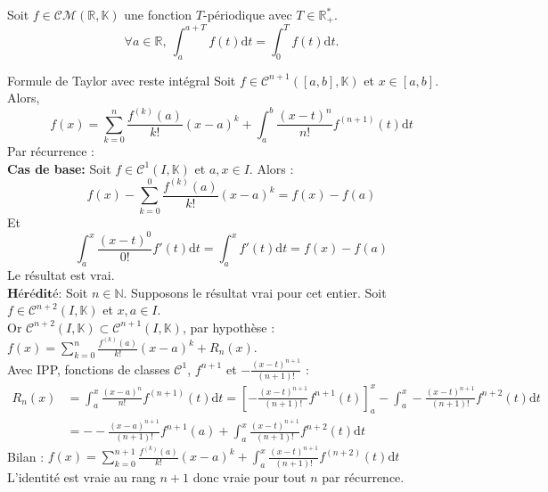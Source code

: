 \documentclass[11pt]{article}
\newcommand*{\K}{\mathbb{K}}
\newcommand*{\R}{\mathbb{R}}
\newcommand*{\N}{\mathbb{N}}
\newcommand*{\CM}{\mathcal{CM}}
\newcommand*{\m}{\mathcal}
\newcommand{\0}{\varnothing}
\newcommand{\dt}{\textrm{d}t}
\begin{document}
\begin{corr}{}{}
    Soit $f\in\CM(\R,\K)$ une fonction $T$-périodique avec $T\in\R^*_+$.
    \begin{equation*}
        \forall a\in\R, ~ \int_a^{a+T}f(t)\dt=\int_0^Tf(t)\dt.
    \end{equation*}
\end{corr}

\begin{thm}{Formule de Taylor avec reste intégral}{}
    Soit $f\in\m{C}^{n+1}([a,b],\K)$ et $x\in[a,b]$. Alors,
    \begin{equation*}
        f(x)=\sum_{k=0}^n\frac{f^{(k)}(a)}{k!}(x-a)^k+\int_a^b\frac{(x-t)^n}{n!}f^{(n+1)}(t)\dt
    \end{equation*}
    \tcblower
    Par récurrence :\\
    \textbf{Cas de base:} Soit $f\in\m{C}^1(I,\K)$ et $a,x\in I$. Alors :
    \begin{equation*}
        f(x)-\sum_{k=0}^0\frac{f^{(k)}(a)}{k!}(x-a)^k=f(x)-f(a)
    \end{equation*}
    Et
    \begin{equation*}
        \int_a^x\frac{(x-t)^0}{0!}f'(t)\dt=\int_a^xf'(t)\dt=f(x)-f(a)
    \end{equation*}
    Le résultat est vrai.\\
    $\textbf{Hérédité:}$ Soit $n\in\N$. Supposons le résultat vrai pour cet entier. Soit $f\in\m{C}^{n+2}(I,\K)$ et $x,a\in I$.\\
    Or $\m{C}^{n+2}(I,\K)\subset\m{C}^{n+1}(I,\K)$, par hypothèse : $f(x)=\sum_{k=0}^n\frac{f^{(k)}(a)}{k!}(x-a)^k+R_n(x)$.\\
    Avec IPP, fonctions de classes $\m{C}^1$, $f^{n+1}$ et $-\frac{(x-t)^{n+1}}{(n+1)!}$ :
    \begin{align*}
        R_n(x)&= \int_a^x\frac{(x-a)^n}{n!}f^{(n+1)}(t)\dt = \left[ -\frac{(x-t)^{n+1}}{(n+1)!}f^{n+1}(t) \right]_a^x - \int_a^x-\frac{(x-t)^{n+1}}{(n+1)!}f^{n+2}(t)\dt\\
        &=--\frac{(x-a)^{n+1}}{(n+1)!}f^{n+1}(a)+\int_a^x\frac{(x-t)^{n+1}}{(n+1)!}f^{n+2}(t)\dt
    \end{align*}
    Bilan : $f(x)=\sum_{k=0}^{n+1}\frac{f^{(k)}(a)}{k!}(x-a)^k+\int_a^x\frac{(x-t)^{n+1}}{(n+1)!}f^{(n+2)}(t)\dt$\\
    L'identité est vraie au rang $n+1$ donc vraie pour tout $n$ par récurrence.
\end{thm}
\end{document}
